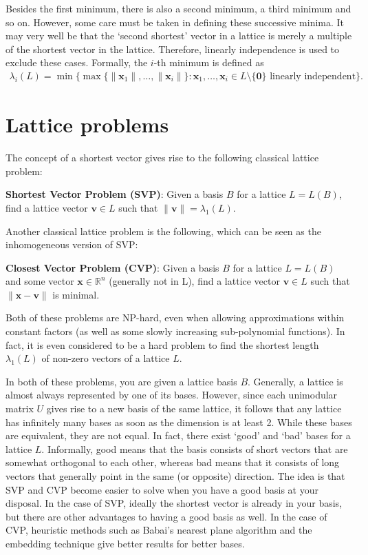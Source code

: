 \documentclass{article}[11pt]
\newcommand{\bfv}{\mathbf{v}}
\newcommand{\bfx}{\mathbf{x}}
\newcommand{\bfzero}{\mathbf{0}}
\newcommand{\R}{{\mathbb R}}
\begin{document}
Besides the first minimum, there is also a second minimum, a third minimum and so on. However, some care must be taken in defining these successive minima. It may very well be that the `second shortest' vector in a lattice is merely a multiple of the shortest vector in the lattice. Therefore, linearly independence is used to exclude these cases. Formally, the $i$-th minimum is defined as 
    \begin{align*}
    \lambda_i(L) = \min\{\max\{\|\bfx_1\|,\ldots,\|\bfx_i\|\} : \bfx_1,\ldots,\bfx_i \in L\setminus \{\bfzero\} \text{ linearly independent}\}. 
    \end{align*}

\section*{Lattice problems}
The concept of a shortest vector gives rise to the following classical lattice problem:

\vspace{11pt}\noindent\textbf{Shortest Vector Problem (SVP)}: Given a basis $B$ for a lattice $L = L(B)$, find a lattice vector $\bfv \in L$ such that $\|\bfv\|=\lambda_1(L)$.

\vspace{11pt}\noindent Another classical lattice problem is the following, which can be seen as the inhomogeneous version of SVP:

\vspace{11pt}\noindent\textbf{Closest Vector Problem (CVP)}: Given a basis $B$ for a lattice $L = L(B)$ and some vector $\bfx \in \R^n$ (generally not in L), find a lattice vector $\bfv \in L$ such that $\|\bfx-\bfv\|$ is minimal.

\vspace{11pt}\noindent Both of these problems are NP-hard, even when allowing approximations within constant factors (as well as some slowly increasing sub-polynomial functions). In fact, it is even considered to be a hard problem to find the shortest length $\lambda_1(L)$ of non-zero vectors of a lattice $L$. 

In both of these problems, you are given a lattice basis $B$. Generally, a lattice is almost always represented by one of its bases. However, since each unimodular matrix $U$ gives rise to a new basis of the same lattice, it follows that any lattice has infinitely many bases as soon as the dimension is at least 2. While these bases are equivalent, they are not equal. In fact, there exist `good' and `bad' bases for a lattice $L$. Informally, good means that the basis consists of short vectors that are somewhat orthogonal to each other, whereas bad means that it consists of long vectors that generally point in the same (or opposite) direction. The idea is that SVP and CVP become easier to solve when you have a good basis at your disposal. In the case of SVP, ideally the shortest vector is already in your basis, but there are other advantages to having a good basis as well. In the case of CVP, heuristic methods such as Babai's nearest plane algorithm and the embedding technique give better results for better bases.
\end{document}
